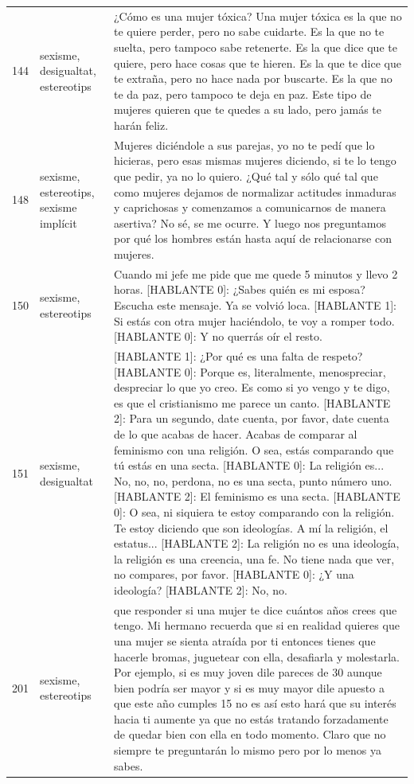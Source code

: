 \begin{longtable}{c>{\raggedright}p{2.0cm}p{12.1cm}}
144 & sexisme, desigualtat, estereotips & ¿Cómo es una mujer tóxica? Una mujer tóxica es la que no te quiere perder, pero no sabe cuidarte. Es la que no te suelta, pero tampoco sabe retenerte. Es la que dice que te quiere, pero hace cosas que te hieren. Es la que te dice que te extraña, pero no hace nada por buscarte. Es la que no te da paz, pero tampoco te deja en paz. Este tipo de mujeres quieren que te quedes a su lado, pero jamás te harán feliz. \\
148 & sexisme, estereotips, sexisme implícit & Mujeres diciéndole a sus parejas, yo no te pedí que lo hicieras, pero esas mismas mujeres diciendo, si te lo tengo que pedir, ya no lo quiero. ¿Qué tal y sólo qué tal que como mujeres dejamos de normalizar actitudes inmaduras y caprichosas y comenzamos a comunicarnos de manera asertiva? No sé, se me ocurre. Y luego nos preguntamos por qué los hombres están hasta aquí de relacionarse con mujeres. \\
150 & sexisme, estereotips & Cuando mi jefe me pide que me quede 5 minutos y llevo 2 horas. 
[HABLANTE 0]: ¿Sabes quién es mi esposa? Escucha este mensaje. Ya se volvió loca. 
[HABLANTE 1]: Si estás con otra mujer haciéndolo, te voy a romper todo. 
[HABLANTE 0]: Y no querrás oír el resto. \\
151 & sexisme, desigualtat & [HABLANTE 1]: ¿Por qué es una falta de respeto? 
[HABLANTE 0]: Porque es, literalmente, menospreciar, despreciar lo que yo creo. Es como si yo vengo y te digo, es que el cristianismo me parece un canto. 
[HABLANTE 2]: Para un segundo, date cuenta, por favor, date cuenta de lo que acabas de hacer. Acabas de comparar al feminismo con una religión. O sea, estás comparando que tú estás en una secta. 
[HABLANTE 0]: La religión es... No, no, no, perdona, no es una secta, punto número uno. 
[HABLANTE 2]: El feminismo es una secta. 
[HABLANTE 0]: O sea, ni siquiera te estoy comparando con la religión. Te estoy diciendo que son ideologías. A mí la religión, el estatus... 
[HABLANTE 2]: La religión no es una ideología, la religión es una creencia, una fe. No tiene nada que ver, no compares, por favor. 
[HABLANTE 0]: ¿Y una ideología? 
[HABLANTE 2]: No, no. \\
201 & sexisme, estereotips & que responder si una mujer te dice cuántos años crees que tengo. Mi hermano recuerda que si en realidad quieres que una mujer se sienta atraída por ti entonces tienes que hacerle bromas, juguetear con ella, desafiarla y molestarla. Por ejemplo, si es muy joven dile pareces de 30 aunque bien podría ser mayor y si es muy mayor dile apuesto a que este año cumples 15 no es así esto hará que su interés hacia ti aumente ya que no estás tratando forzadamente de quedar bien con ella en todo momento. Claro que no siempre te preguntarán lo mismo pero por lo menos ya sabes. \\

\end{longtable}
